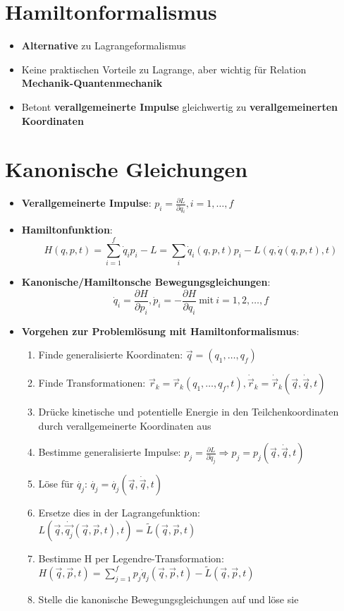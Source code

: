 \section{Hamiltonformalismus}%
\label{hform:sec:hamiltonformalismus}

\begin{itemize}
	\item \textbf{Alternative} zu Lagrangeformalismus
	\item Keine praktischen Vorteile zu Lagrange, aber wichtig für Relation \textbf{Mechanik-Quantenmechanik}
	\item Betont \textbf{verallgemeinerte Impulse} gleichwertig zu \textbf{verallgemeinerten Koordinaten}
\end{itemize}

\section{Kanonische Gleichungen}
\label{hform:sec:kanonische_gleichungen}

\begin{itemize}
	\item \textbf{Verallgemeinerte Impulse}: $p_i = \frac{\partial L}{\partial \dot{q}_i}, i = 1, \dots, f$
	\item \textbf{Hamiltonfunktion}:
	$$
		H(q, p, t) = \sum^f_{i=1}\dot{q}_ip_i - L = \sum_i\dot{q}_i(q, p, t)p_i - L(q, \dot{q}(q, p, t), t)
	$$
	\item \textbf{Kanonische/Hamiltonsche Bewegungsgleichungen}:
	$$
		\dot{q}_i = \frac{\partial H}{\partial p_i}, \dot{p}_i = -\frac{\partial H}{\partial q_i}\ \text{mit}\ i = 1, 2, \dots, f
	$$
	\item \textbf{Vorgehen zur Problemlösung mit Hamiltonformalismus}:
	\begin{enumerate}
		\item Finde generalisierte Koordinaten: $\vec{q} = (q_1, \dots, q_f)$
		\item Finde Transformationen: $\vec{r}_k = \vec{r}_k(q_1, \dots, q_f, t), \dot{\vec{r}}_k = \dot{\vec{r}}_k(\vec{q}, \dot{\vec{q}}, t)$
		\item Drücke kinetische und potentielle Energie in den Teilchenkoordinaten durch verallgemeinerte Koordinaten aus
		\item Bestimme generalisierte Impulse: $p_j = \frac{\partial L}{\partial \dot{q}_j} \Rightarrow p_j = p_j(\vec{q}, \dot{\vec{q}}, t)$
		\item Löse für $\dot{q_j}$: $\dot{q_j} = \dot{q_j}(\vec{q}, \dot{\vec{q}}, t)$
		\item Ersetze dies in der Lagrangefunktion: $L(\vec{q}, \dot{\vec{q_j}}(\vec{q}, \vec{p}, t), t) = \widetilde{L}(\vec{q}, \vec{p}, t)$
		\item Bestimme H per Legendre-Transformation: $H(\vec{q}, \vec{p}, t) = \sum^f_{j=1}p_j\dot{q}_j(\vec{q}, \vec{p}, t) - \widetilde{L}(\vec{q}, \vec{p}, t)$
		\item Stelle die kanonische Bewegungsgleichungen auf und löse sie
	\end{enumerate}
\end{itemize}

